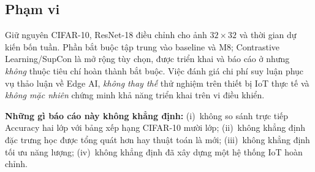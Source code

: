 \subsection{Phạm vi}
\label{sec:intro-scope}

Giữ nguyên CIFAR-10, ResNet-18 điều chỉnh cho ảnh $32 \times 32$ và thời gian dự kiến bốn
tuần. Phần bắt buộc tập trung vào baseline và M8; Contrastive Learning/SupCon là mở rộng tùy
chọn, được triển khai và báo cáo ở  nhưng \emph{không} thuộc tiêu chí
hoàn thành bắt buộc. Việc đánh giá chi phí suy luận phục vụ thảo luận về Edge AI, \emph{không
thay thế} thử nghiệm trên thiết bị IoT thực tế và \emph{không mặc nhiên} chứng minh khả năng
triển khai trên vi điều khiển.

\begin{limbox}
\textbf{Những gì báo cáo này không khẳng định:} (i)~không so sánh trực tiếp Accuracy hai lớp
với bảng xếp hạng CIFAR-10 mười lớp; (ii)~không khẳng định đặc trưng học được tổng quát hơn
hay thuật toán là mới; (iii)~không khẳng định tối ưu năng lượng; (iv)~không khẳng định đã xây
dựng một hệ thống IoT hoàn chỉnh.
\end{limbox}
